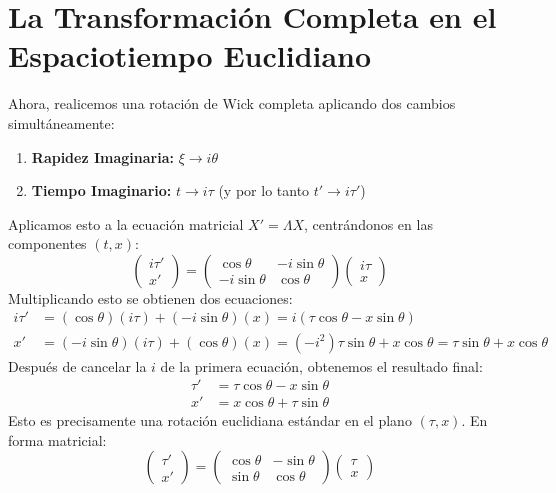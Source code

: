 \documentclass[11pt,a4paper]{book}
\begin{document}
\section{La Transformación Completa en el Espaciotiempo Euclidiano}
Ahora, realicemos una rotación de Wick completa aplicando dos cambios simultáneamente:
\begin{enumerate}
    \item \textbf{Rapidez Imaginaria:} $\xi \to i\theta$
    \item \textbf{Tiempo Imaginario:} $t \to i\tau$ (y por lo tanto $t' \to i\tau'$)
\end{enumerate}
Aplicamos esto a la ecuación matricial $X'=\Lambda X$, centrándonos en las componentes $(t,x)$:
\[ \begin{pmatrix} i\tau' \\ x' \end{pmatrix} = \begin{pmatrix} \cos\theta & -i\sin\theta \\ -i\sin\theta & \cos\theta \end{pmatrix} \begin{pmatrix} i\tau \\ x \end{pmatrix} \]
Multiplicando esto se obtienen dos ecuaciones:
\begin{align*}
    i\tau' &= (\cos\theta)(i\tau) + (-i\sin\theta)(x) = i(\tau\cos\theta - x\sin\theta) \\
    x' &= (-i\sin\theta)(i\tau) + (\cos\theta)(x) = (-i^2)\tau\sin\theta + x\cos\theta = \tau\sin\theta + x\cos\theta
\end{align*}
Después de cancelar la $i$ de la primera ecuación, obtenemos el resultado final:
\[
\begin{aligned}
\tau' &= \tau\cos\theta - x\sin\theta \\
x' &= x\cos\theta + \tau\sin\theta
\end{aligned}
\]
Esto es precisamente una rotación euclidiana estándar en el plano $(\tau, x)$. En forma matricial:
\[
\boxed{
\begin{pmatrix} \tau' \\ x' \end{pmatrix} = \begin{pmatrix} \cos\theta & -\sin\theta \\ \sin\theta & \cos\theta \end{pmatrix} \begin{pmatrix} \tau \\ x \end{pmatrix}
}
\]
\end{document}
